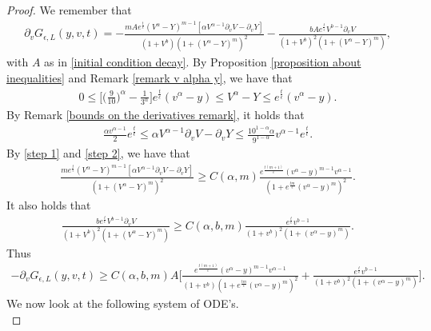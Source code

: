 \documentclass[11pt]{article}
\numberwithin{equation}{section}
\begin{document}
 \begin{proof}
We remember that
     \begin{align*}
           \partial_{v}G_{\epsilon,L}(y,v,t)=-\frac{mA e^{\frac{t}{\epsilon}}(V^{\alpha}-Y)^{m-1}[\alpha V^{\alpha-1}\partial_{v}V-\partial_{v}Y]}{(1+V^{b})(1+(V^{\alpha}-Y)^{m})^{2}}-\frac{b Ae^{\frac{t}{\epsilon}}V^{b-1}\partial_{v}V}{(1+V^{b})^{2}(1+(V^{\alpha}-Y)^{m})},
     \end{align*}
    with $A$ as in \eqref{initial condition decay}. By Proposition \ref{proposition about inequalities} and Remark \ref{remark v alpha y}, we have that
     \begin{align}\label{step 1}
      0\leq \bigg[\Big(\frac{9}{10}\Big)^{\alpha}-\frac{1}{3^{\alpha}}\bigg]e^{\frac{t}{\epsilon}}(v^{\alpha}-y)\leq V^{\alpha}-Y\leq   e^{\frac{t}{\epsilon}}(v^{\alpha}-y).
     \end{align}
     By Remark \ref{bounds on the derivatives remark}, it holds that 
     \begin{align}\label{step 2}
          \frac{\alpha v^{\alpha-1}}{2}e^{\frac{t}{\epsilon}}\leq    \alpha V^{\alpha-1}\partial_{v}{V}-\partial_{v}Y\leq  \frac{10^{1-\alpha}\alpha}{9^{1-\alpha}} v^{\alpha-1}e^{\frac{t}{\epsilon}}.
     \end{align}
     By \eqref{step 1} and \eqref{step 2}, we have that
     \begin{align*}
           \frac{m e^{\frac{t}{\epsilon}}(V^{\alpha}-Y)^{m-1}[\alpha V^{\alpha-1}\partial_{v}V-\partial_{v}Y]}{(1+(V^{\alpha}-Y)^{m})^{2}}\geq C(\alpha,m)\frac{e^{\frac{t(m+1)}{\epsilon}}(v^{\alpha}-y)^{m-1}v^{\alpha-1}}{(1+e^{\frac{tm}{\epsilon}}(v^{\alpha}-y)^{m})^{2}}.
     \end{align*}
     It also holds that
     \begin{align*}
         \frac{b e^{\frac{t}{\epsilon}}V^{b-1}\partial_{v}V}{(1+V^{b})^{2}(1+(V^{\alpha}-Y)^{m})}\geq C(\alpha,b,m)\frac{e^{\frac{t}{\epsilon}} v^{b-1}}{(1+v^{b})^{2}(1+(v^{\alpha}-y)^{m})}.
     \end{align*}
     Thus
     \begin{align*}
        -\partial_{v}G_{\epsilon,L}(y,v,t)\geq C(\alpha,b,m)A\bigg[\frac{e^{\frac{t(m+1)}{\epsilon}}(v^{\alpha}-y)^{m-1}v^{\alpha-1}}{(1+v^{b})(1+e^{\frac{tm}{\epsilon}}(v^{\alpha}-y)^{m})^{2}}+\frac{e^{\frac{t}{\epsilon}} v^{b-1}}{(1+v^{b})^{2}(1+(v^{\alpha}-y)^{m})}\bigg].
     \end{align*}
  We now look at the following system of ODE's.
  \begin{equation}\label{ode system different initial data}

\end{equation}
\end{proof}
\end{document}
